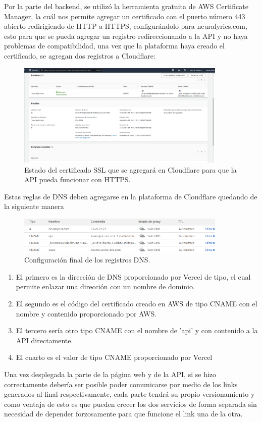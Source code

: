 \documentclass[12pt, a4paper, titlepage]{report}
\begin{document}
Por la parte del backend, se utilizó la herramienta gratuita de AWS Certificate Manager, la cuál nos permite agregar un certificado con el puerto número 443 abierto redirigiendo de HTTP a HTTPS, 	configurándolo para neuralyrics.com, esto para que se pueda agregar un registro redireccionando a la API y no haya problemas de compatibilidad, una vez que la plataforma haya creado el certificado, se agregan dos registros a Cloudflare:


\begin{figure}[H] 
	\includegraphics[width=10cm]{./imagenes/DnsSSL/DNS_aws.png}
	\centering \caption{Estado del certificado SSL que se agregará en Cloudflare para que la API pueda funcionar con HTTPS.}
\end{figure}
Estas reglas de DNS deben agregarse en la plataforma de Cloudflare quedando de la siguiente manera 
\begin{figure}[H] 
	\includegraphics[width=10cm]{./imagenes/DnsSSL/Config_DNS.png}
	\centering \caption{Configuración final de los registros DNS.}
\end{figure}
\begin{enumerate}
	\item El primero es la dirección de DNS proporcionado por Vercel de tipo, el cual permite enlazar una dirección con un nombre de dominio.
	\item El segundo es el código del certificado creado en AWS de tipo CNAME con el nombre y contenido proporcionado por AWS.
	\item El tercero sería otro tipo CNAME con el nombre de 'api' y con contenido a la API directamente.
	\item El cuarto es el valor de tipo CNAME proporcionado por Vercel
\end{enumerate}
Una vez desplegada la parte de la página web y de la API, si se hizo correctamente debería ser posible poder comunicarse por medio de los links generados al final respectivamente, cada parte tendrá su propio versionamiento y como ventaja de esto es que pueden crecer los dos servicios de forma separada sin necesidad de depender forzosamente para que funcione el link una de la otra.
\newpage
\end{document}
